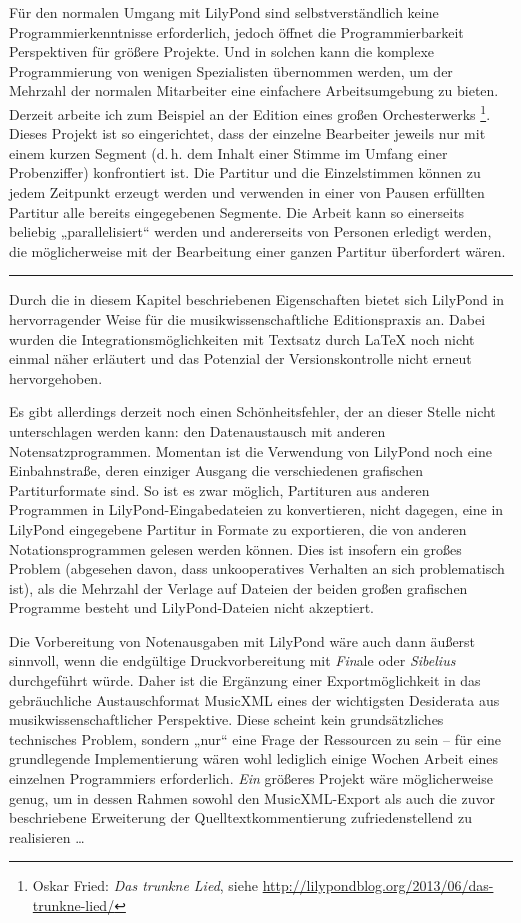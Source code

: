 \documentclass[DIV=12]{scrreprt}
\begin{document}
Für den normalen Umgang mit LilyPond sind selbstverständlich keine Programmierkenntnisse erforderlich, jedoch öffnet die Programmierbarkeit Perspektiven für größere Projekte.
Und in solchen kann die komplexe Programmierung von wenigen Spezialisten übernommen werden, um der Mehrzahl der normalen Mitarbeiter eine einfachere Arbeitsumgebung zu bieten.
Derzeit arbeite ich zum Beispiel an der Edition eines großen Orchesterwerks%
\footnote{Oskar Fried: \emph{Das trunkne Lied}, siehe \url{http://lilypondblog.org/2013/06/das-trunkne-lied/}}.
Dieses Projekt ist so eingerichtet, dass der einzelne Bearbeiter jeweils nur mit einem kurzen Segment (d.\,h. dem Inhalt einer Stimme im Umfang einer Probenziffer) konfrontiert ist.
Die Partitur und die Einzelstimmen können zu jedem Zeitpunkt erzeugt werden und verwenden in einer von Pausen erfüllten Partitur alle bereits eingegebenen Segmente.
Die Arbeit kann so einerseits beliebig „parallelisiert“ werden und andererseits von Personen erledigt werden, die möglicherweise mit der Bearbeitung einer ganzen Partitur überfordert wären.

\bigskip
\hrule
\bigskip

Durch die in diesem Kapitel beschriebenen Eigenschaften bietet sich LilyPond in hervorragender Weise für die musikwissenschaftliche Editionspraxis an.
Dabei wurden die Integrationsmöglichkeiten mit Textsatz durch \LaTeX{} noch nicht einmal näher erläutert und das Potenzial der Versionskontrolle nicht erneut hervorgehoben.

Es gibt allerdings derzeit noch einen Schönheitsfehler, der an dieser Stelle nicht unterschlagen werden kann: den Datenaustausch mit anderen Notensatzprogrammen.
Momentan ist die Verwendung von LilyPond noch eine Einbahnstraße, deren einziger Ausgang die verschiedenen grafischen Partiturformate sind.
So ist es zwar möglich, Partituren aus anderen Programmen in LilyPond-Eingabedateien zu konvertieren, nicht dagegen, eine in LilyPond eingegebene Partitur in Formate zu exportieren, die von anderen Notationsprogrammen gelesen werden können.
Dies ist insofern ein großes Problem (abgesehen davon, dass unkooperatives Verhalten an sich problematisch ist), als die Mehrzahl der Verlage auf Dateien der beiden großen grafischen Programme besteht und LilyPond-Dateien nicht akzeptiert.

Die Vorbereitung von Notenausgaben mit LilyPond wäre auch dann äußerst sinnvoll, wenn die endgültige Druckvorbereitung mit \emph{Fin}ale oder \emph{Sibelius} durchgeführt würde.
Daher ist die Ergänzung einer Exportmöglichkeit in das gebräuchliche Austauschformat MusicXML eines der wichtigsten Desiderata aus musikwissenschaftlicher Perspektive.
Diese scheint kein grundsätzliches technisches Problem, sondern „nur“ eine Frage der Ressourcen zu sein -- für eine grundlegende Implementierung wären wohl lediglich einige Wochen Arbeit eines einzelnen Programmiers erforderlich.
\emph{Ein} größeres Projekt wäre möglicherweise genug, um in dessen Rahmen sowohl den MusicXML-Export als auch die zuvor beschriebene Erweiterung der Quelltextkommentierung zufriedenstellend zu realisieren \dots
\end{document}
